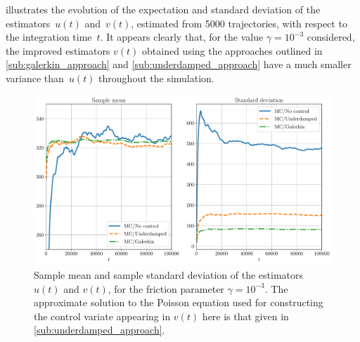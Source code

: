 \documentclass[11pt,a4paper]{article}
\theoremstyle{plain}
\numberwithin{equation}{section}
\begin{document}
 illustrates the evolution of the expectation and standard deviation of the estimators~$u(t)$ and~$v(t)$,
estimated from 5000 trajectories,
with respect to the integration time~$t$.
It appears clearly that,
for the value $\gamma = 10^{-3}$ considered,
the improved estimators $v(t)$ obtained using the approaches outlined in \cref{sub:galerkin_approach} and \cref{sub:underdamped_approach}
have a much smaller variance than~$u(t)$ throughout the simulation.
\begin{figure}[ht]
    \centering
    \includegraphics[width=0.99\linewidth]{figures/time.pdf}
    \caption{
        Sample mean and sample standard deviation of the estimators $u(t)$ and $v(t)$,
        for the friction parameter $\gamma = 10^{-3}$.
        The approximate solution to the Poisson equation used for constructing the control variate appearing in $v(t)$ here
        is that given in \cref{sub:underdamped_approach}.
    }%
    \label{fig:time_bias_variance}
\end{figure}
\end{document}
